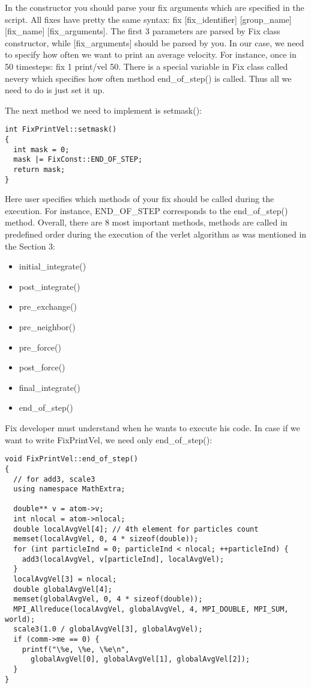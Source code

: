 \documentclass{article}
\begin{document}
In the constructor you should parse your fix arguments which are
specified in the script. All fixes have pretty the same syntax: fix
[fix\_identifier] [group\_name] [fix\_name] [fix\_arguments]. The
first 3 parameters are parsed by Fix class constructor, while
[fix\_arguments] should be parsed by you. In our case, we need to
specify how often we want to print an average velocity. For instance,
once in 50 timesteps: fix 1 print/vel 50. There is a special variable
in Fix class called nevery which specifies how often method
end\_of\_step() is called. Thus all we need to do is just set it up.

The next method we need to implement is setmask():
\begin{center}
\begin{verbatim}
int FixPrintVel::setmask()
{
  int mask = 0;
  mask |= FixConst::END_OF_STEP;
  return mask;
}
\end{verbatim}
\end{center}

Here user specifies which methods of your fix should be called during
the execution. For instance, END\_OF\_STEP corresponds to the
end\_of\_step() method. Overall, there are 8 most important methods,
methods are called in predefined order during the execution of the
verlet algorithm as was mentioned in the Section 3:

\begin{itemize}
\item initial\_integrate()
\item post\_integrate()
\item pre\_exchange()
\item pre\_neighbor()
\item pre\_force()
\item post\_force()
\item final\_integrate()
\item end\_of\_step()
\end{itemize}

Fix developer must understand when he wants to execute his code.  In
case if we want to write FixPrintVel, we need only end\_of\_step():

\begin{center}
\begin{verbatim}
void FixPrintVel::end_of_step()
{
  // for add3, scale3
  using namespace MathExtra;

  double** v = atom->v;
  int nlocal = atom->nlocal;
  double localAvgVel[4]; // 4th element for particles count
  memset(localAvgVel, 0, 4 * sizeof(double));
  for (int particleInd = 0; particleInd < nlocal; ++particleInd) {
    add3(localAvgVel, v[particleInd], localAvgVel);
  }
  localAvgVel[3] = nlocal;
  double globalAvgVel[4];
  memset(globalAvgVel, 0, 4 * sizeof(double));
  MPI_Allreduce(localAvgVel, globalAvgVel, 4, MPI_DOUBLE, MPI_SUM, world);
  scale3(1.0 / globalAvgVel[3], globalAvgVel);
  if (comm->me == 0) {
    printf("\%e, \%e, \%e\n",
      globalAvgVel[0], globalAvgVel[1], globalAvgVel[2]);
  }
}
\end{verbatim}
\end{center}
\end{document}
